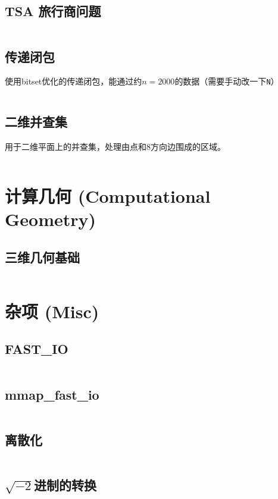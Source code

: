 \documentclass[openany,a4paper]{book}
\begin{document}
\section{TSA 旅行商问题}
\inputminted{cpp}{GraphTheory/Held-Karp_TSP.h}
\section{传递闭包}
使用bitset优化的传递闭包，能通过约$n=2000$的数据（需要手动改一下\verb|N|）
\inputminted{cpp}{GraphTheory/TransitiveClosure.hpp}

\section{二维并查集}
用于二维平面上的并查集，处理由点和8方向边围成的区域。
\inputminted{cpp}{GraphTheory/Dsu2d.cpp}
\chapter{计算几何 (Computational Geometry)}%
\section{三维几何基础}
\inputminted{cpp}{ComputationalGeometry/3D.h}
\chapter{杂项 (Misc)}

\section{FAST\_IO}
\inputminted{cpp}{Misc/fast_io.h}

\section{mmap_fast_io}
\inputminted{cpp}{Misc/mmap_fast_io.hpp}

\section{离散化}
\inputminted{cpp}{Misc/Discretize.h}

\section{\texorpdfstring{$\sqrt{-2}$}{sqrt(-2)}进制的转换}
\inputminted{cpp}{Misc/Base_-2.h}
\end{document}
